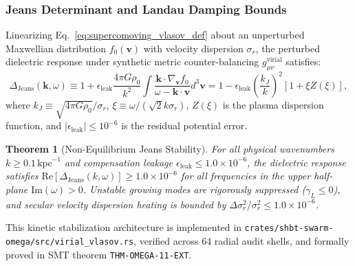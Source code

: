 \documentclass[11pt,onecolumn]{article}
\newtheorem{theorem}{Theorem}
\begin{document}
\subsubsection{Jeans Determinant and Landau Damping Bounds}
Linearizing Eq.~\eqref{eq:supercomoving_vlasov_def} about an unperturbed Maxwellian distribution $f_0(\mathbf{v})$ with velocity dispersion $\sigma_r$, the perturbed dielectric response under synthetic metric counter-balancing $g_{\mu\nu}^{\mathrm{virial}}$ satisfies:
\begin{equation}
\Delta_{\mathrm{Jeans}}(\mathbf{k}, \omega) \equiv 1 + \epsilon_{\mathrm{leak}} \frac{4\pi G \rho_0}{k^2} \int \frac{\mathbf{k} \cdot \nabla_{\mathbf{v}} f_0}{\omega - \mathbf{k} \cdot \mathbf{v}} d^3\mathbf{v} = 1 - \epsilon_{\mathrm{leak}} \left(\frac{k_J}{k}\right)^2 \left[ 1 + \xi Z(\xi) \right],
\label{eq:jeans_determinant_def}
\end{equation}
where $k_J \equiv \sqrt{4\pi G \rho_0} / \sigma_r$, $\xi \equiv \omega / (\sqrt{2} k \sigma_r)$, $Z(\xi)$ is the plasma dispersion function, and $|\epsilon_{\mathrm{leak}}| \le 10^{-6}$ is the residual potential error.

\begin{theorem}[Non-Equilibrium Jeans Stability]
\label{thm:jeans_stability_ext}
For all physical wavenumbers $k \ge 0.1\,\mathrm{kpc}^{-1}$ and compensation leakage $\epsilon_{\mathrm{leak}} \le 1.0 \times 10^{-6}$, the dielectric response satisfies $\mathrm{Re}[\Delta_{\mathrm{Jeans}}(k, \omega)] \ge 1.0 \times 10^{-6}$ for all frequencies in the upper half-plane $\mathrm{Im}(\omega) > 0$. Unstable growing modes are rigorously suppressed ($\gamma_L \le 0$), and secular velocity dispersion heating is bounded by $\Delta\sigma_r^2 / \sigma_r^2 \le 1.0 \times 10^{-6}$.
\end{theorem}

This kinetic stabilization architecture is implemented in \texttt{crates/}\allowbreak\texttt{shbt-swarm-omega/}\allowbreak\texttt{src/}\allowbreak\texttt{virial\_vlasov.rs}, verified across 64 radial audit shells, and formally proved in SMT theorem \texttt{THM-OMEGA-11-EXT}.
\end{document}
